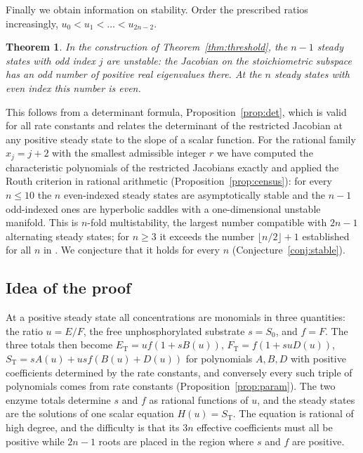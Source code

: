 \documentclass[11pt]{article}
\theoremstyle{plain}
\newtheorem{theorem}{Theorem}[section]
\theoremstyle{definition}
\theoremstyle{remark}
\numberwithin{equation}{section}
\newcommand{\ET}{E_{\mathrm T}}
\newcommand{\FT}{F_{\mathrm T}}
\newcommand{\ST}{S_{\mathrm T}}
\begin{document}
Finally we obtain information on stability. Order the prescribed ratios increasingly,
\(u_0<u_1<\dots<u_{2n-2}\).

\begin{theorem}\label{thm:unstable}
In the construction of Theorem~\ref{thm:threshold}, the \(n-1\) steady states with odd index
\(j\) are unstable: the Jacobian on the stoichiometric subspace has an odd number of positive
real eigenvalues there. At the \(n\) steady states with even index this number is even.
\end{theorem}

This follows from a determinant formula, Proposition~\ref{prop:det}, which is valid for all
rate constants and relates the determinant of the restricted Jacobian at any positive steady
state to the slope of a scalar function. For the rational family \(x_j=j+2\) with the smallest
admissible integer \(r\) we have computed the characteristic polynomials of the restricted
Jacobians exactly and applied the Routh criterion in rational arithmetic
(Proposition~\ref{prop:census}): for every \(n\le10\) the \(n\) even-indexed steady states are
asymptotically stable and the \(n-1\) odd-indexed ones are hyperbolic saddles with a
one-dimensional unstable manifold. This is \(n\)-fold multistability, the largest number
compatible with \(2n-1\) alternating steady states; for \(n\ge3\) it exceeds the number
\(\lfloor n/2\rfloor+1\) established for all \(n\) in \cite{FRW2020}. We conjecture that it
holds for every \(n\) (Conjecture~\ref{conj:stable}).

\subsection{Idea of the proof}
At a positive steady state all concentrations are monomials in three quantities: the ratio
\(u=E/F\), the free unphosphorylated substrate \(s=S_0\), and \(f=F\). The three totals then
become \(\ET=uf(1+sB(u))\), \(\FT=f(1+suD(u))\), \(\ST=sA(u)+usf(B(u)+D(u))\) for polynomials
\(A,B,D\) with positive coefficients determined by the rate constants, and conversely every
such triple of polynomials comes from rate constants (Proposition~\ref{prop:param}). The two
enzyme totals determine \(s\) and \(f\) as rational functions of \(u\), and the steady states
are the solutions of one scalar equation \(H(u)=\ST\).
The equation is rational of high degree, and the difficulty is that its \(3n\) effective
coefficients must all be positive while \(2n-1\) roots are placed in the region where \(s\)
and \(f\) are positive.
\end{document}
